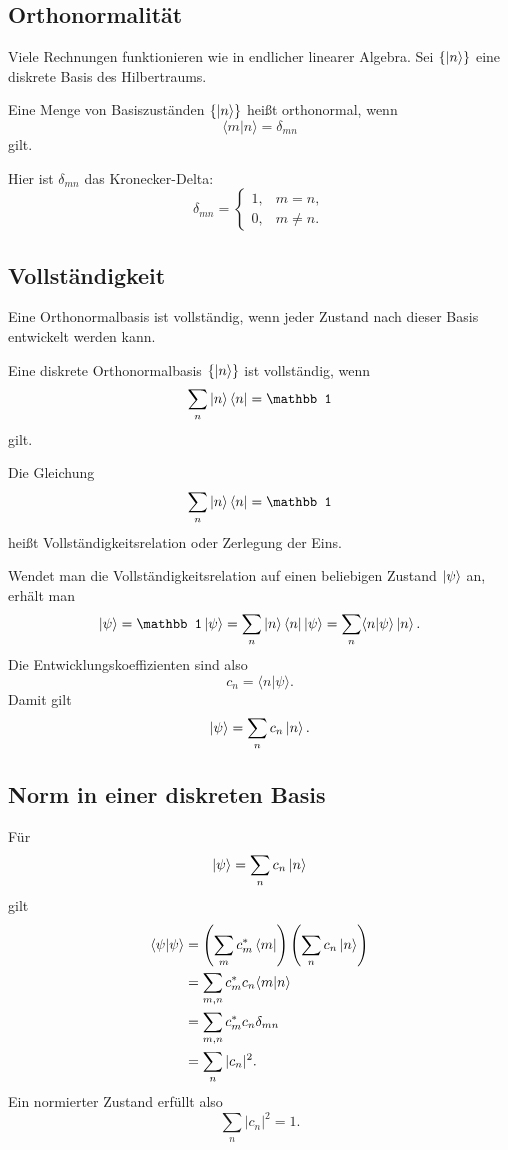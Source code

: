 \subsection{Orthonormalität}

Viele Rechnungen funktionieren wie in endlicher linearer Algebra. Sei $\{\left|n\right\rangle\}$ eine diskrete Basis des Hilbertraums.

\begin{definitionbox}
Eine Menge von Basiszuständen $\{\left|n\right\rangle\}$ heißt orthonormal, wenn
\[
    \langle m|n\rangle=\delta_{mn}
\]
gilt.
\end{definitionbox}

Hier ist $\delta_{mn}$ das Kronecker-Delta:
\[
    \delta_{mn}=\begin{cases}
        1, & m=n,\\
        0, & m\ne n.
    \end{cases}
\]

\subsection{Vollständigkeit}

Eine Orthonormalbasis ist vollständig, wenn jeder Zustand nach dieser Basis entwickelt werden kann.

\begin{definitionbox}
Eine diskrete Orthonormalbasis $\{\left|n\right\rangle\}$ ist vollständig, wenn
\[
    \sum_n \ket{n}\bra{n}=\mathbb 1
\]
gilt.
\end{definitionbox}

Die Gleichung
\[
    \sum_n \ket{n}\bra{n}=\mathbb 1
\]
heißt Vollständigkeitsrelation oder Zerlegung der Eins.

\begin{derivationbox}
Wendet man die Vollständigkeitsrelation auf einen beliebigen Zustand $\left|\psi\right\rangle$ an, erhält man
\[
    \ket{\psi}=\mathbb 1\ket{\psi}
    =\sum_n \ket{n}\bra{n}\ket{\psi}
    =\sum_n \langle n|\psi\rangle\ket{n}.
\]
Die Entwicklungskoeffizienten sind also
\[
    c_n=\langle n|\psi\rangle.
\]
Damit gilt
\[
    \left|\psi\right\rangle=\sum_n c_n\left|n\right\rangle.
\]
\end{derivationbox}

\subsection{Norm in einer diskreten Basis}

Für
\[
    \left|\psi\right\rangle=\sum_n c_n\left|n\right\rangle
\]
gilt
\[
\begin{aligned}
    \langle\psi|\psi\rangle
    &=\left(\sum_m c_m^*\left\langle m\right|\right)
      \left(\sum_n c_n\left|n\right\rangle\right) \\
    &=\sum_{m,n}c_m^*c_n\langle m|n\rangle \\
    &=\sum_{m,n}c_m^*c_n\delta_{mn} \\
    &=\sum_n |c_n|^2.
\end{aligned}
\]
Ein normierter Zustand erfüllt also
\[
    \sum_n |c_n|^2=1.
\]

